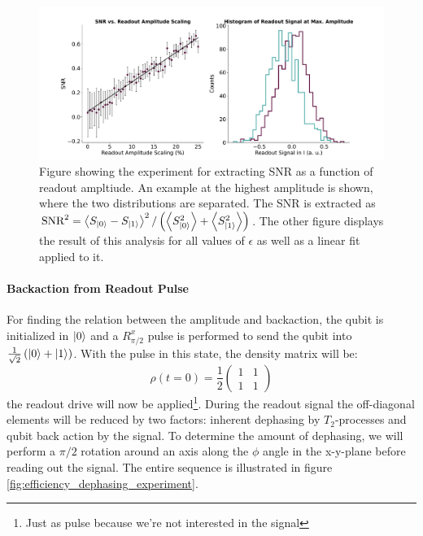 \begin{figure}
    \raggedleft
    \includegraphics[width = 1.0 \linewidth]{Calibrations/Figures/SNR_vs_amplitude.pdf}
    \caption{Figure showing the experiment for extracting SNR as a function of readout ampltiude. An example at the highest amplitude is shown, where the two distributions are separated. The SNR is extracted as $\text{SNR}^2 = \expval{S_{\ket{0}} - S_{\ket{1}}}^2/\left(\expval{S^2_{\ket{0}}} +\expval{S^2_{\ket{1}}}\right)$. The other figure displays the result of this analysis for all values of $\epsilon$ as well as a linear fit applied to it.}
    \label{fig:effiiency_results_SNR}
\end{figure}



\paragraph{Backaction from Readout Pulse}
For finding the relation between the amplitude and backaction, the qubit is initialized in $\ket{0}$ and a $R^x_{\pi/2}$ pulse is performed to send the qubit into $\frac{1}{\sqrt{2}}\left(\ket{0} + \ket{1}\right)$. With the pulse in this state, the density matrix will be:
\begin{equation}
    \rho(t=0) = \frac12 \begin{pmatrix}1 & 1 \\ 1 & 1\end{pmatrix}
\end{equation}
the readout drive will now be applied\footnote{Just as pulse because we're not interested in the signal}. During the readout signal the off-diagonal elements will be reduced by two factors: inherent dephasing by $T_2$-processes and qubit back action by the signal. To determine the amount of dephasing, we will perform a $\pi/2$ rotation around an axis along the $\phi$ angle in the x-y-plane before reading out the signal. The entire sequence is illustrated in figure \ref{fig:efficiency_dephasing_experiment}.

